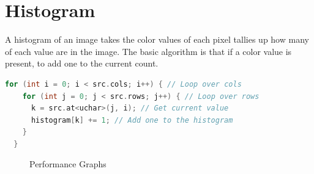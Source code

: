 \documentclass[a4paper]{article}
\begin{document}
\section*{Histogram}

A histogram of an image takes the color values of each pixel tallies up how many of each value are in the image. The basic algorithm is that if a color value is present, to add one to the current count. 
\begin{lstlisting}[language=C++]
  for (int i = 0; i < src.cols; i++) { // Loop over cols
    for (int j = 0; j < src.rows; j++) { // Loop over rows
      k = src.at<uchar>(j, i); // Get current value
      histogram[k] += 1; // Add one to the histogram 
    }
  }
\end{lstlisting} 




\pagebreak
\begin{figure}
\hfill
{}
\hfill
{}
\hfill
\caption{Performance Graphs}
\end{figure}
\end{document}
